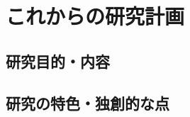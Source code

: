 \documentclass[11pt,a4paper,uplatex,twoside,dvipdfmx]{ujarticle} 	%
\newcommand{\subject}[1]{\noindent{\sffamily\gtfamily\bfseries #1}~~}
\newcommand{\研究課題名}{\mgfamily ストカスティック形式、原始ブラックホール、重力波観測から迫るインフレーション}
\newcommand{\研究機関名}{\mgfamily 名古屋大学}
\newcommand{\申請者氏名}{\mgfamily 多田 祐一郎}
\newcommand{\研究代表者氏名}{\申請者氏名}
\newcommand{\研究期間の最終元号年度}{34}	%
\begin{document}
{	%
	

}

\section{これからの研究計画}
\subsection{研究目的・内容}
\subsection{研究の特色・独創的な点}
\newcommand{\研究の特色と独創的な点}{%

	\subject{① 先行研究との比較・本研究の独創的な点}
	
	
	\vspace{3pt}
	\subject{② 当該研究の位置づけ}
	
	
	\vspace{3pt}
	\subject{③ 予想されるインパクト}

}
\end{document}
